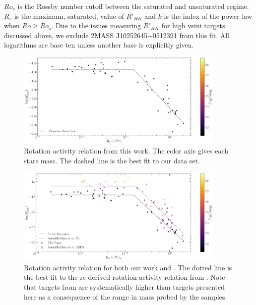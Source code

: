 \noindent $Ro_{s}$ is the Rossby number cutoff between the saturated and
unsaturated regime. $R_{s}$ is the maximum, saturated, value of $R'_{HK}$ and
$k$ is the index of the power law when $Ro \geq Ro_{s}$. Due to the
issues measuring $R'_{HK}$ for high vsini targets discussed above, we exclude
2MASS J10252645+0512391 from this fit. All logarithms are base ten unless
another base is explicitly given.
\begin{table}[ht]
  \small
    \centering
    \setlength{\tabcolsep}{4pt}
    
  \caption{Calculated Rossby Numbers and $R'_{HK}$ values. All circular data
  points in Figures \ref{fig:RpHKvsRossbySelf} \& \ref{fig:RpHKvsRossbyDef} are
  present in this table. Masses are taken from the MEarth database. A machine
  readable version of this table is available. Rows where the activity metric
  is in bold face were estimates derived from our model fit not empirical
  measurements.}
    \label{tab:finalData}
\end{table}
\begin{figure}
    \centering
    \includegraphics[width=0.9\textwidth]{figures/magActivity/RpHKvsR0_MC_justThisPaper.pdf}
	\caption{Rotation activity relation from this work. The color axis gives
	each stars mass. The dashed line is the best fit to our data set.}
    \label{fig:RpHKvsRossbySelf}
\end{figure}
\begin{figure}
    \centering
    \includegraphics[width=0.9\textwidth]{figures/magActivity/RpHKvsR0_MC.pdf}
	\caption{Rotation activity relation for both our work and \citet{Def17}.
	The dotted line is the best fit to the re-derived rotation-activity
	relation from \citet{Def17}.  Note that targets from \citet{Def17} are
	systematically higher than targets presented here as a consequence of the
	range in mass probed by the samples.}
    \label{fig:RpHKvsRossbyDef}
\end{figure}
